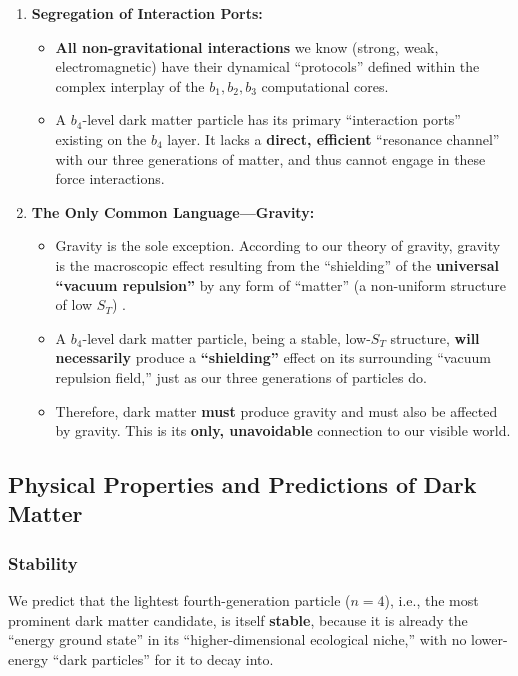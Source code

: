 \documentclass[11pt, a4paper]{article}
\begin{document}
\begin{enumerate}
    \item \textbf{Segregation of Interaction Ports:}
    \begin{itemize}
        \item \textbf{All non-gravitational interactions} we know (strong, weak, electromagnetic) have their dynamical ``protocols'' defined within the complex interplay of the $b_1, b_2, b_3$ computational cores.
        \item A $b_4$-level dark matter particle has its primary ``interaction ports'' existing on the $b_4$ layer. It lacks a \textbf{direct, efficient} ``resonance channel'' with our three generations of matter, and thus cannot engage in these force interactions.
    \end{itemize}

    \item \textbf{The Only Common Language—Gravity:}
    \begin{itemize}
        \item Gravity is the sole exception. According to our theory of gravity, gravity is the macroscopic effect resulting from the ``shielding'' of the \textbf{universal ``vacuum repulsion''} by any form of ``matter'' (a non-uniform structure of low $S_T$) \cite{Newton1687}.
        \item A $b_4$-level dark matter particle, being a stable, low-$S_T$ structure, \textbf{will necessarily} produce a \textbf{``shielding''} effect on its surrounding ``vacuum repulsion field,'' just as our three generations of particles do.
        \item Therefore, dark matter \textbf{must} produce gravity and must also be affected by gravity. This is its \textbf{only, unavoidable} connection to our visible world.
    \end{itemize}
\end{enumerate}

\subsection{Physical Properties and Predictions of Dark Matter}

\subsubsection{Stability}
We predict that the lightest fourth-generation particle ($n=4$), i.e., the most prominent dark matter candidate, is itself \textbf{stable}, because it is already the ``energy ground state'' in its ``higher-dimensional ecological niche,'' with no lower-energy ``dark particles'' for it to decay into.
\end{document}
